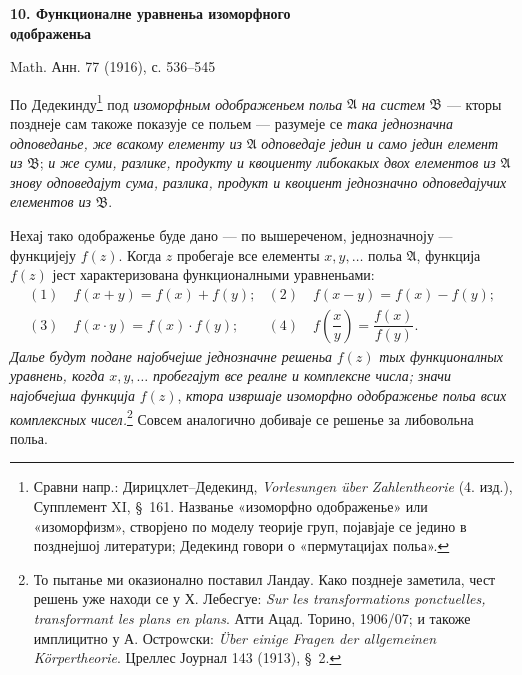 \documentclass[11pt]{article}
\providecommand{\Afield}{\mathfrak A}
\providecommand{\Bfield}{\mathfrak B}
\begin{document}
\begin{center}
{\Large\bfseries 10. Функционалне уравненьа изоморфного\\ одображеньа}\par
\vspace{1.25em}
Math. Анн. 77 (1916), с. 536--545
\end{center}

\vspace{3em}

По Дедекинду\footnote{Сравни напр.: Дирицхлет--Дедекинд, \emph{Vorlesungen über Zahlentheorie} (4. изд.), Супплемент XI, \S\ 161. Названье «изоморфно одображенье» или «изоморфизм», створјено по моделу теорије груп, појавјаје се једино в позднејшој литератури; Дедекинд говори о «пермутацијах польа».} под {\itshape изоморфным одображеньем польа} \(\Afield\) {\itshape на систем} \(\Bfield\) --- кторы позднеје сам такоже показује се польем --- разумеје се {\itshape така једнозначна одповеданье, же всакому елементу из} \(\Afield\) {\itshape одповедаје једин и само једин елемент из} \(\Bfield\); {\itshape и же суми, разлике, продукту и квоциенту либокакых двох елементов из} \(\Afield\) {\itshape знову одповедајут сума, разлика, продукт и квоциент једнозначно одповедајучих елементов из} \(\Bfield\).

Нехај тако одображенье буде дано --- по вышереченом, једнозначноју --- функцијеју \(f(z)\). Когда \(z\) пробегаје все елементы \(x,y,\ldots\) польа \(\Afield\), функција \(f(z)\) јест характеризована функционалными уравненьами:
\[
\begin{array}{ll}
(1)\quad f(x+y)=f(x)+f(y); & (2)\quad f(x-y)=f(x)-f(y);\\[0.45em]
(3)\quad f(x\cdot y)=f(x)\cdot f(y); & (4)\quad f\!\left(\dfrac{x}{y}\right)=\dfrac{f(x)}{f(y)}.
\end{array}
\]
{\itshape Далье будут подане најобчејше једнозначне решеньа} \(f(z)\) {\itshape тых функционалных уравнень, когда} \(x,y,\ldots\) {\itshape пробегајут все реалне и комплексне числа; значи најобчејша функција} \(f(z)\), {\itshape ктора извршаје изоморфно одображенье польа всих комплексных чисел.}\footnote{То пытанье ми оказионално поставил Ландау. Како позднеје заметила, чест решень уже находи се у Х. Лебесгуе: \emph{Sur les transformations ponctuelles, transformant les plans en plans}. Атти Ацад. Торино, 1906/07; и такоже имплицитно у А. Остроwски: \emph{Über einige Fragen der allgemeinen Körpertheorie}. Цреллес Јоурнал 143 (1913), \S\ 2.} Совсем аналогично добиваје се решенье за либовольна польа.
\end{document}
